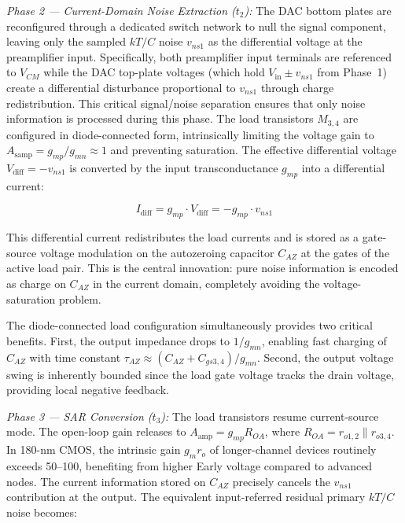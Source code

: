 \documentclass[journal]{IEEEtran}
\begin{document}
\textit{Phase 2 --- Current-Domain Noise Extraction ($t_2$):} The DAC bottom plates are reconfigured through a dedicated switch network to null the signal component, leaving only the sampled $kT/C$ noise $v_{ns1}$ as the differential voltage at the preamplifier input. Specifically, both preamplifier input terminals are referenced to $V_{CM}$ while the DAC top-plate voltages (which hold $V_{\text{in}} \pm v_{ns1}$ from Phase~1) create a differential disturbance proportional to $v_{ns1}$ through charge redistribution. This critical signal/noise separation ensures that only noise information is processed during this phase. The load transistors $M_{3,4}$ are configured in diode-connected form, intrinsically limiting the voltage gain to $A_{\text{samp}} = g_{mp}/g_{mn} \approx 1$ and preventing saturation. The effective differential voltage $V_{\text{diff}} = -v_{ns1}$ is converted by the input transconductance $g_{mp}$ into a differential current:

\begin{equation}
I_{\text{diff}} = g_{mp} \cdot V_{\text{diff}} = -g_{mp} \cdot v_{ns1}
\label{eq:current_conversion}
\end{equation}

This differential current redistributes the load currents and is stored as a gate-source voltage modulation on the autozeroing capacitor $C_{AZ}$ at the gates of the active load pair. This is the central innovation: pure noise information is encoded as charge on $C_{AZ}$ in the current domain, completely avoiding the voltage-saturation problem.

The diode-connected load configuration simultaneously provides two critical benefits. First, the output impedance drops to $1/g_{mn}$, enabling fast charging of $C_{AZ}$ with time constant $\tau_{AZ} \approx (C_{AZ}+C_{gs3,4})/g_{mn}$. Second, the output voltage swing is inherently bounded since the load gate voltage tracks the drain voltage, providing local negative feedback.

\textit{Phase 3 --- SAR Conversion ($t_3$):} The load transistors resume current-source mode. The open-loop gain releases to $A_{\text{amp}} = g_{mp}R_{OA}$, where $R_{OA} = r_{o1,2} \parallel r_{o3,4}$. In 180-nm CMOS, the intrinsic gain $g_m r_o$ of longer-channel devices routinely exceeds 50--100, benefiting from higher Early voltage compared to advanced nodes. The current information stored on $C_{AZ}$ precisely cancels the $v_{ns1}$ contribution at the output. The equivalent input-referred residual primary $kT/C$ noise becomes:
\end{document}

